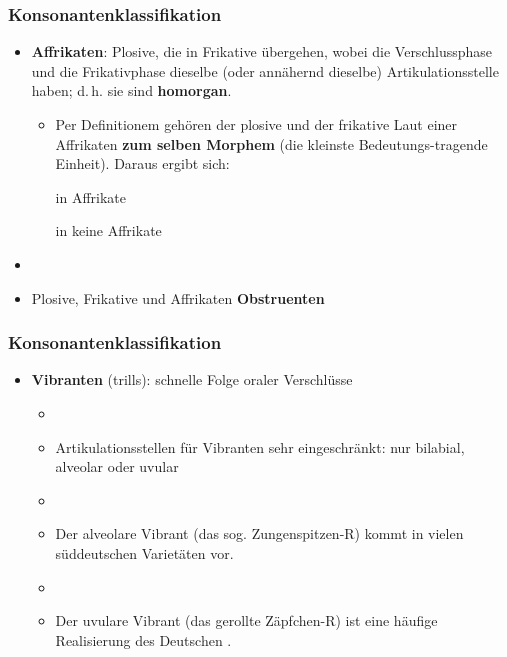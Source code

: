 
\begin{frame}
\frametitle{Konsonantenklassifikation}

		\begin{itemize}
			\item \textbf{Affrikaten}: Plosive, die in Frikative übergehen, wobei die Verschlussphase und die Frikativphase dieselbe (oder annähernd dieselbe) Artikulationsstelle haben; d.\,h. sie sind \textbf{homorgan}.

			\ea \textipa{[ \t{pf} , \t{ts} , \t{tS} , \t{dZ} ]}
			\z

			\begin{itemize}
				\item Per Definitionem gehören der plosive und der frikative Laut einer Affrikaten \textbf{zum selben Morphem} (die kleinste Bedeutungs-tragende Einheit). Daraus ergibt sich:

				\ea \textipa{[ \t{ts} ]} in  \ras Affrikate
				\z
				
				\ea \textipa{[ \t{ts} ]} in  \ras keine Affrikate
				\z

			\end{itemize}
		
		\item[]
		\item Plosive, Frikative und Affrikaten \ras \textbf{Obstruenten}
	\end{itemize}
	
\end{frame}



\begin{frame}
\frametitle{Konsonantenklassifikation}

		\begin{itemize}
			\item \textbf{Vibranten} (trills): schnelle Folge oraler Verschlüsse
			\begin{itemize}
				\item[]
				\item Artikulationsstellen für Vibranten sehr eingeschränkt: nur bilabial, alveolar oder uvular
				\item[]
				\item Der alveolare Vibrant \textipa{[ r ]} (das sog. Zungenspitzen-R) kommt in vielen süddeutschen Varietäten vor.
				\item[]
				\item Der uvulare Vibrant \textipa{[ \textscr ]} (das gerollte Zäpfchen-R) ist eine häufige Realisierung des Deutschen .
			\end{itemize}
			 
	\end{itemize}
	
\end{frame}


